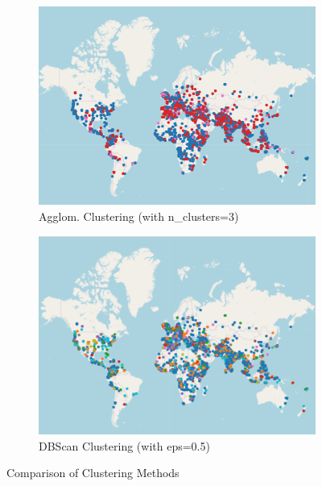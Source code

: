 \documentclass{article}
\begin{document}
\begin{figure}[htbp]
    \begin{subfigure}{0.45\linewidth}
        \centering
        \includegraphics[width=\linewidth]{img//Clustering/Clusters Agglo.png}
        \caption{Agglom. Clustering (with n\_clusters=3)}
        \label{fig:agglo}
    \end{subfigure}
    \hfill
    \begin{subfigure}{0.45\linewidth}
        \centering
        \includegraphics[width=\linewidth]{img//Clustering/Clusters DB Scan_resized.png}
        \caption{DBScan Clustering (with eps=0.5)}
        \label{fig:dbscan}
    \end{subfigure}
    
    \caption{Comparison of Clustering Methods}
    \label{fig:clustering-comparison}
\end{figure}
\end{document}
